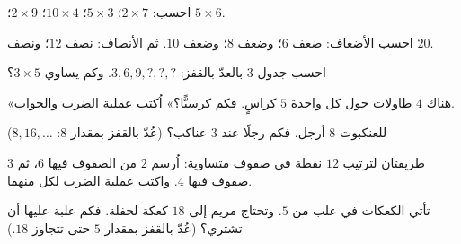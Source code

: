 \begin{exercise}[$\star$]\label{exo:g2:mult:4}
احسب: $2 \times 7$؛ \quad $5 \times 3$؛ \quad $10 \times 4$؛
\quad $2 \times 9$؛ \quad $5 \times 6$.
\end{exercise}

\begin{exercise}[$\star$]\label{exo:g2:mult:5}
احسب الأضعاف: ضعف $6$؛ وضعف $8$؛ وضعف $10$.
ثم الأنصاف: نصف $12$؛ ونصف $20$.
\end{exercise}

\begin{exercise}[$\star$]\label{exo:g2:mult:6}
احسب جدول $3$ بالعدّ بالقفز: $3, 6, 9, ?, ?, ?$. وكم يساوي
$3 \times 5$؟
\end{exercise}

\begin{exercise}[$\star$]\label{exo:g2:mult:7}
«هناك $4$ طاولات حول كل واحدة $5$ كراسٍ. فكم كرسيًّا؟»
اُكتب عملية الضرب والجواب.
\end{exercise}

\begin{exercise}[$\star$]\label{exo:g2:mult:8}
للعنكبوت $8$ أرجل. فكم رجلًا عند $3$ عناكب؟ (عُدّ بالقفز
بمقدار $8$: $8, 16, \dots$)
\end{exercise}

\begin{exercise}[$\star$]\label{exo:g2:mult:9}
طريقتان لترتيب $12$ نقطة في صفوف متساوية: اُرسم $2$ من الصفوف فيها
$6$، ثم $3$ صفوف فيها $4$. واكتب عملية الضرب لكل منهما.
\end{exercise}

\begin{exercise}[$\star\star$]\label{exo:g2:mult:10}
تأتي الكعكات في علب من $5$. وتحتاج مريم إلى $18$ كعكة لحفلة.
فكم علبة عليها أن تشتري؟ (عُدّ بالقفز بمقدار $5$ حتى تتجاوز $18$.)
\end{exercise}
